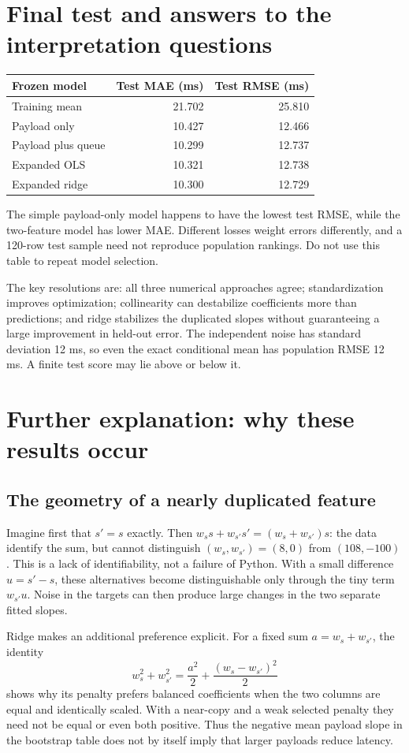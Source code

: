 \section{Final test and answers to the interpretation questions}
\begin{center}
\begin{tabular}{lrr}\toprule
Frozen model & Test MAE (ms)&Test RMSE (ms)\\\midrule
Training mean&21.702&25.810\\
Payload only&10.427&12.466\\
Payload plus queue&10.299&12.737\\
Expanded OLS&10.321&12.738\\
Expanded ridge&10.300&12.729\\\bottomrule
\end{tabular}
\end{center}
The simple payload-only model happens to have the lowest test RMSE, while the two-feature model has lower MAE. Different losses weight errors differently, and a 120-row test sample need not reproduce population rankings. Do not use this table to repeat model selection.

The key resolutions are: all three numerical approaches agree; standardization improves optimization; collinearity can destabilize coefficients more than predictions; and ridge stabilizes the duplicated slopes without guaranteeing a large improvement in held-out error. The independent noise has standard deviation 12 ms, so even the exact conditional mean has population RMSE 12 ms. A finite test score may lie above or below it.

\section*{Further explanation: why these results occur}
\subsection*{The geometry of a nearly duplicated feature}
Imagine first that $s'=s$ exactly. Then
$w_s s+w_{s'}s'=(w_s+w_{s'})s$: the data identify the sum, but cannot distinguish
$(w_s,w_{s'})=(8,0)$ from $(108,-100)$. This is a lack of identifiability, not a failure of Python.
With a small difference $u=s'-s$, these alternatives become distinguishable only through the tiny term $w_{s'}u$.
Noise in the targets can then produce large changes in the two separate fitted slopes.

Ridge makes an additional preference explicit. For a fixed sum $a=w_s+w_{s'}$, the identity
\[
w_s^2+w_{s'}^2=\frac{a^2}{2}+\frac{(w_s-w_{s'})^2}{2}
\]
shows why its penalty prefers balanced coefficients when the two columns are equal and identically scaled.
With a near-copy and a weak selected penalty they need not be equal or even both positive.
Thus the negative mean payload slope in the bootstrap table does not by itself imply that larger payloads reduce latency.

